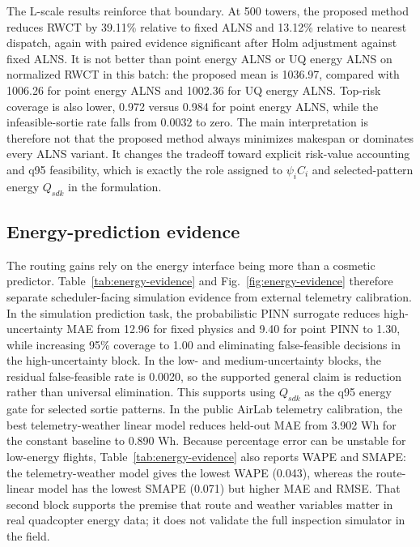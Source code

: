 The L-scale results reinforce that boundary. At 500 towers, the proposed method reduces RWCT by 39.11\% relative to fixed ALNS and 13.12\% relative to nearest dispatch, again with paired evidence significant after Holm adjustment against fixed ALNS. It is not better than point energy ALNS or UQ energy ALNS on normalized RWCT in this batch: the proposed mean is 1036.97, compared with 1006.26 for point energy ALNS and 1002.36 for UQ energy ALNS. Top-risk coverage is also lower, 0.972 versus 0.984 for point energy ALNS, while the infeasible-sortie rate falls from 0.0032 to zero. The main interpretation is therefore not that the proposed method always minimizes makespan or dominates every ALNS variant. It changes the tradeoff toward explicit risk-value accounting and q95 feasibility, which is exactly the role assigned to $\psi_i C_i$ and selected-pattern energy \(Q_{sdk}\) in the formulation.

\subsection{Energy-prediction evidence}

The routing gains rely on the energy interface being more than a cosmetic predictor. Table~\ref{tab:energy-evidence} and Fig.~\ref{fig:energy-evidence} therefore separate scheduler-facing simulation evidence from external telemetry calibration. In the simulation prediction task, the probabilistic PINN surrogate reduces high-uncertainty MAE from 12.96 for fixed physics and 9.40 for point PINN to 1.30, while increasing 95\% coverage to 1.00 and eliminating false-feasible decisions in the high-uncertainty block. In the low- and medium-uncertainty blocks, the residual false-feasible rate is 0.0020, so the supported general claim is reduction rather than universal elimination. This supports using \(Q_{sdk}\) as the q95 energy gate for selected sortie patterns. In the public AirLab telemetry calibration, the best telemetry-weather linear model reduces held-out MAE from 3.902 Wh for the constant baseline to 0.890 Wh. Because percentage error can be unstable for low-energy flights, Table~\ref{tab:energy-evidence} also reports WAPE and SMAPE: the telemetry-weather model gives the lowest WAPE (0.043), whereas the route-linear model has the lowest SMAPE (0.071) but higher MAE and RMSE. That second block supports the premise that route and weather variables matter in real quadcopter energy data; it does not validate the full inspection simulator in the field.




